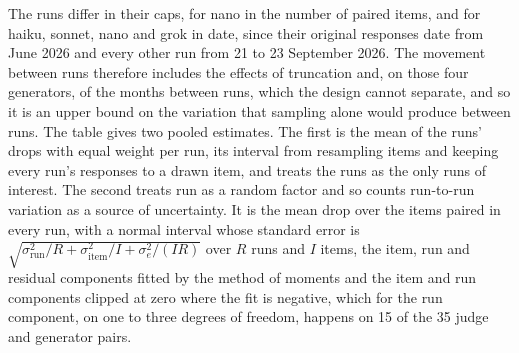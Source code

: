 The runs differ in their caps, for nano in the number of paired items, and
for haiku, sonnet, nano and grok in date, since their original responses date
from June 2026 and every other run from 21 to 23 September 2026. The movement
between runs therefore includes the effects of truncation and, on those four
generators, of the months between runs, which the design cannot separate, and
so it is an upper bound on the variation that sampling alone would produce
between runs. The table gives two pooled
estimates. The first is the mean of the runs' drops with equal weight per
run, its interval from resampling items and keeping every run's responses to
a drawn item, and treats the runs as the only runs of interest. The second
treats run as a random factor and so counts run-to-run variation as a source
of uncertainty. It is the mean drop over the items paired in every run, with
a normal interval whose standard error is
$\sqrt{\sigma^2_{\mathrm{run}}/R + \sigma^2_{\mathrm{item}}/I + \sigma^2_{e}/(IR)}$
over $R$ runs and $I$ items, the item, run and residual components fitted by
the method of moments and the item and run components clipped at zero where
the fit is negative, which for the run component, on one to three degrees of
freedom, happens on 15 of the 35 judge and generator pairs.

